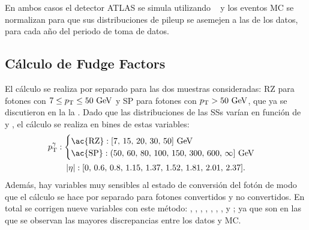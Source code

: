 En ambos casos el detector \ac{ATLAS} se simula utilizando \GEANT~\cite{Geant4} y los eventos \ac{MC} se normalizan para que sus distribuciones de pileup se asemejen a las de los datos, para cada año del periodo de toma de datos.


\subsection{C\'alculo de Fudge Factors}
\label{subsec:ss_corrections:ffs:calculation}





El cálculo se realiza por separado para las dos muestras consideradas: \ac{RZ} para fotones con \(7\leq p_{\text{T}}\leq 50~\text{GeV}\) y \ac{SP} para fotones con \(p_{\text{T}}> 50~\text{GeV}\), que ya se discutieron en la la \Sect{\ref{subsec:pid_ss:pid:event_selection}}. Dado que las distribuciones de las \acp{SS} varían en función de \pt y \abseta, el cálculo se realiza en bines de estas variables:
\begin{gather*}
    \ptgam:
    \begin{cases}
        \text{\ac{RZ}}: [7,\, 15,\, 20,\, 30,\, 50] ~\gev\\
        \text{\ac{SP}}: (50,\, 60,\, 80,\, 100,\, 150,\, 300,\, 600,\, \infty] ~\gev\\
    \end{cases}\\
    \abseta: [0,\, 0.6,\, 0.8,\, 1.15,\, 1.37,\, 1.52,\, 1.81,\, 2.01,\, 2.37].
\end{gather*}
Además, hay variables muy sensibles al estado de conversión del fotón de modo que el cálculo se hace por separado para fotones convertidos y no convertidos. En total se corrigen nueve variables con este método: \eratio, \fside, \reta, \rphi, \rhad, \rhado, \wone, \weta y \wstot; ya que son en las que se observan las mayores discrepancias entre los datos y \ac{MC}.

